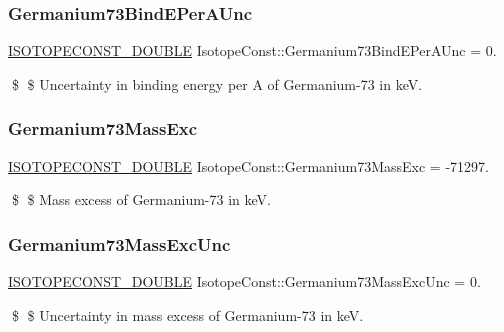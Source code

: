 \subsubsection{\texorpdfstring{Germanium73\+Bind\+E\+Per\+A\+Unc}{Germanium73BindEPerAUnc}}
{\footnotesize\ttfamily \mbox{\hyperlink{group___isotope_const-_macros_ga8f45a7272ce02c0b4c65c44636ed719a}{I\+S\+O\+T\+O\+P\+E\+C\+O\+N\+S\+T\+\_\+\+D\+O\+U\+B\+LE}} Isotope\+Const\+::\+Germanium73\+Bind\+E\+Per\+A\+Unc = 0.}

\$ \$ Uncertainty in binding energy per A of Germanium-\/73 in keV. \mbox{\label{group___isotope_const-_germanium-_ge73_gaa6b17c4668b74b31dde7181dbd019a4d}} 
\subsubsection{\texorpdfstring{Germanium73\+Mass\+Exc}{Germanium73MassExc}}
{\footnotesize\ttfamily \mbox{\hyperlink{group___isotope_const-_macros_ga8f45a7272ce02c0b4c65c44636ed719a}{I\+S\+O\+T\+O\+P\+E\+C\+O\+N\+S\+T\+\_\+\+D\+O\+U\+B\+LE}} Isotope\+Const\+::\+Germanium73\+Mass\+Exc = -\/71297.}

\$ \$ Mass excess of Germanium-\/73 in keV. \mbox{\label{group___isotope_const-_germanium-_ge73_ga11702656446f4ba7c45f8c026542d6e8}} 
\subsubsection{\texorpdfstring{Germanium73\+Mass\+Exc\+Unc}{Germanium73MassExcUnc}}
{\footnotesize\ttfamily \mbox{\hyperlink{group___isotope_const-_macros_ga8f45a7272ce02c0b4c65c44636ed719a}{I\+S\+O\+T\+O\+P\+E\+C\+O\+N\+S\+T\+\_\+\+D\+O\+U\+B\+LE}} Isotope\+Const\+::\+Germanium73\+Mass\+Exc\+Unc = 0.}

\$ \$ Uncertainty in mass excess of Germanium-\/73 in keV. \mbox{\label{group___isotope_const-_germanium-_ge73_ga891b2334320ad7d526286fdf3f5ec279}} 

